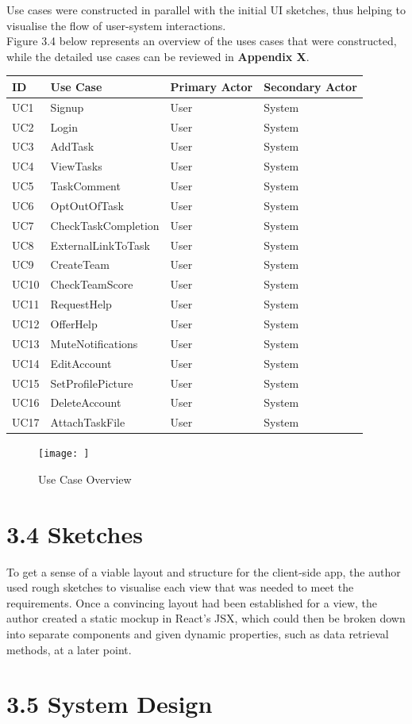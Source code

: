 \documentclass[12pt]{report}
\begin{document}
Use cases were constructed in parallel with the initial UI sketches,
thus helping to visualise the flow of user-system interactions.\\
Figure 3.4 below represents an overview of the uses cases that
were constructed, while the detailed use cases can be reviewed in
\textbf{Appendix X}.

\begin{longtable}[]{@{}llll@{}}
\toprule
ID & Use Case & Primary Actor & Secondary Actor\tabularnewline
\midrule
\endhead
UC1 & Signup & User & System\tabularnewline
UC2 & Login & User & System\tabularnewline
UC3 & AddTask & User & System\tabularnewline
UC4 & ViewTasks & User & System\tabularnewline
UC5 & TaskComment & User & System\tabularnewline
UC6 & OptOutOfTask & User & System\tabularnewline
UC7 & CheckTaskCompletion & User & System\tabularnewline
UC8 & ExternalLinkToTask & User & System\tabularnewline
UC9 & CreateTeam & User & System\tabularnewline
UC10 & CheckTeamScore & User & System\tabularnewline
UC11 & RequestHelp & User & System\tabularnewline
UC12 & OfferHelp & User & System\tabularnewline
UC13 & MuteNotifications & User & System\tabularnewline
UC14 & EditAccount & User & System\tabularnewline
UC15 & SetProfilePicture & User & System\tabularnewline
UC16 & DeleteAccount & User & System\tabularnewline
UC17 & AttachTaskFile & User & System\tabularnewline
\bottomrule
\end{longtable}

\begin{figure}[htbp]
\centering
\texttt{[image: ]}
\caption{Use Case Overview}
\end{figure}

\section{3.4 Sketches}\label{sketches}

To get a sense of a viable layout and structure for the client-side app,
the author used rough sketches to visualise each view that was needed to
meet the requirements. Once a convincing layout had been established for
a view, the author created a static mockup in React's JSX, which could
then be broken down into separate components and given dynamic
properties, such as data retrieval methods, at a later point.

\section{3.5 System Design}\label{system-design}
\end{document}
